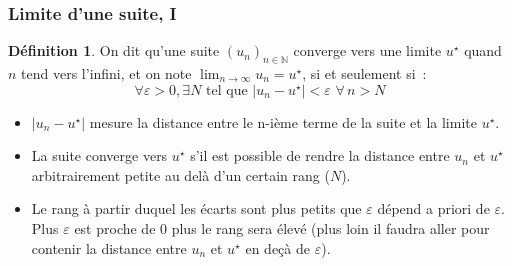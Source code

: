 \documentclass[10pt,notheorems]{beamer}
\theoremstyle{plain}
\theoremstyle{definition} %
\newtheorem{definition}{Définition}
\begin{document}
\begin{frame}
  \frametitle{Limite d'une suite, I}


  \begin{definition}
    On dit qu'une suite $(u_n)_{n\in\mathbb N}$ converge vers une limite $u^{\star}$ quand $n$ tend vers l'infini, et on note $\lim_{n\rightarrow\infty}u_n = u^{\star}$, si et seulement si~:
    \[
      \forall \varepsilon>0, \exists N\text{ tel que } |u_n-u^{\star}|<\varepsilon\,\, \forall \, n>N
    \]
  \end{definition}

  \bigskip

  \begin{itemize}

  \item $|u_n-u^{\star}|$ mesure la distance entre le n-ième terme de la suite et la limite $u^{\star}$.\newline

  \item La suite converge vers $u^{\star}$ s'il est possible de rendre la distance entre $u_n$ et $u^{\star}$ arbitrairement petite au delà d'un certain rang ($N$).\newline

  \item Le rang à partir duquel les écarts sont plus petits que $\varepsilon$ dépend a priori de $\varepsilon$. Plus $\varepsilon$ est proche de 0 plus le rang sera élevé (plus loin il faudra aller pour contenir la distance entre $u_n$ et $u^{\star}$ en deçà de $\varepsilon$).

  \end{itemize}

\end{frame}
\end{document}
